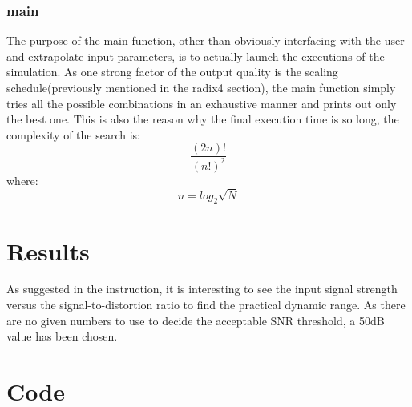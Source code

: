 \documentclass[a4paper]{article}
\begin{document}
\subsubsection{main}
The purpose of the main function, other than obviously interfacing with the user and extrapolate input parameters, is to actually launch the executions of the simulation.
As one strong factor of the output quality is the scaling schedule(previously mentioned in the radix4 section), the main function simply tries all the possible combinations in an exhaustive manner and prints out only the best one. This is also the reason why the final execution time is so long, the complexity of the search is: $$\frac{(2n)!}{(n!)^2}$$
where:
$$n = log_2{\sqrt{N}}$$
\section{Results}
As suggested in the instruction, it is interesting to see the input signal strength versus the signal-to-distortion ratio to find the practical dynamic range.
As there are no given numbers to use to decide the acceptable SNR threshold, a 50dB value has been chosen.
\begin{figure}
	\centering
	\resizebox{1.0\textwidth}{!}{}
\end{figure}
\begin{figure}
	\centering
	\resizebox{1.0\textwidth}{!}{}
\end{figure}
\begin{figure}
	\centering
	\resizebox{1.0\textwidth}{!}{}
\end{figure}
\begin{figure}
	\centering
	\resizebox{1.0\textwidth}{!}{}
\end{figure}
\begin{figure}
	\centering
	\resizebox{1.0\textwidth}{!}{}
\end{figure}

\section{Code}
\end{document}
